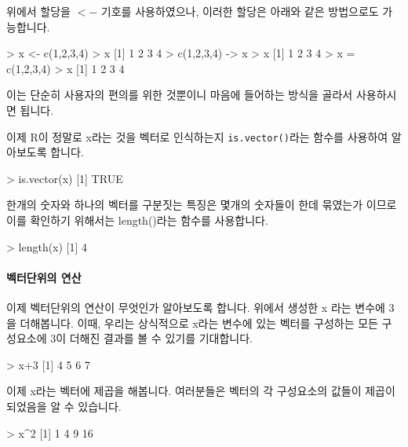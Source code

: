 \documentclass[tutorial.tex]{subfiles}
\begin{document}
위에서 할당을 $<-$ 기호를 사용하였으나, 이러한 할당은 아래와 같은 방법으로도 가능합니다. 

\begin{Schunk}
	\begin{Soutput}
> x <- c(1,2,3,4)
> x
[1] 1 2 3 4
> c(1,2,3,4) -> x
> x
[1] 1 2 3 4
> x = c(1,2,3,4)		
> x
[1] 1 2 3 4
\end{Soutput}
\end{Schunk}

이는 단순히 사용자의 편의를 위한 것뿐이니 마음에 들어하는 방식을 골라서 사용하시면 됩니다. 

이제 R이 정말로 x라는 것을 벡터로 인식하는지 \texttt{is.vector()}라는 함수를 사용하여 알아보도록 합니다. 

\begin{Schunk}
\begin{Soutput}
> is.vector(x)
[1] TRUE
\end{Soutput}
\end{Schunk}

한개의 숫자와 하나의 벡터를 구분짓는 특징은 몇개의 숫자들이 한데 묶였는가 이므로 이를 확인하기 위해서는 length()라는 함수를 사용합니다. 

\begin{Schunk}
\begin{Soutput}
> length(x)
[1] 4
\end{Soutput}
\end{Schunk}

\paragraph{벡터단위의 연산}  이제 벡터단위의 연산이 무엇인가 알아보도록 합니다. 
위에서 생성한 x 라는 변수에 3 을 더해봅니다. 
이때, 우리는 상식적으로 x라는 변수에 있는 벡터를 구성하는 모든 구성요소에 3이 더해진 결과를 볼 수 있기를 기대합니다. 

\begin{Schunk}
\begin{Soutput}
> x+3
[1] 4 5 6 7	
\end{Soutput}
\end{Schunk}

이제 x라는 벡터에 제곱을 해봅니다. 
여러분들은 벡터의 각 구성요소의 값들이 제곱이 되었음을 알 수 있습니다. 
\begin{Schunk}
\begin{Soutput}
> x^2
[1]  1  4  9 16
\end{Soutput}
\end{Schunk}
\end{document}
